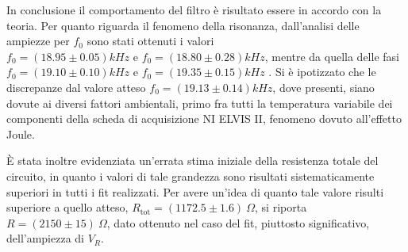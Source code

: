 

In conclusione il comportamento del filtro è risultato essere in accordo con la teoria.
Per quanto riguarda il fenomeno della risonanza, dall'analisi delle ampiezze per $f_0$ sono stati
ottenuti i valori \\
$f_0 = (18.95 \pm 0.05) kHz$ e $f_0 = (18.80 \pm 0.28)kHz$, mentre
da quella delle fasi $f_0 = (19.10 \pm 0.10)kHz$ e $f_0 = (19.35 \pm 0.15)kHz$ .
Si è ipotizzato che le discrepanze dal valore atteso  $f_0 = (19.13 \pm 0.14) kHz$, dove presenti, siano dovute ai diversi fattori ambientali, primo fra tutti la temperatura
variabile dei componenti della scheda di acquisizione NI ELVIS II, fenomeno dovuto all’effetto Joule.

È stata inoltre evidenziata un'errata stima iniziale della resistenza totale del circuito, in quanto i valori di tale
grandezza sono risultati sistematicamente superiori in tutti i fit realizzati.
Per avere un'idea di quanto tale valore risulti superiore a quello atteso, $R_{\text{tot}} = (1172.5 \pm 1.6) \ \Omega$, si riporta
$R =( 2150 \pm 15 )  \ \Omega$, dato ottenuto nel caso del fit, piuttosto significativo, dell'ampiezza di $V_R$.
